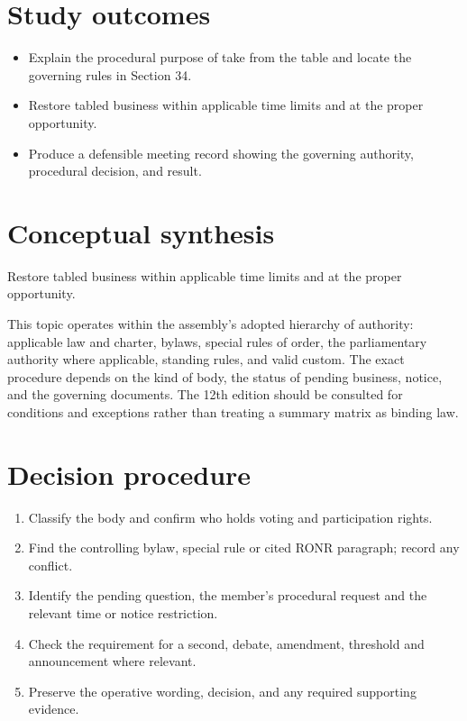 \documentclass[11pt]{article}
\begin{document}
\SuiteOpen
{}
\section{Study outcomes}
\begin{itemize}[leftmargin=*,itemsep=4pt]
\item Explain the procedural purpose of take from the table and locate the governing rules in Section 34.
\item Restore tabled business within applicable time limits and at the proper opportunity.
\item Produce a defensible meeting record showing the governing authority, procedural decision, and result.
\end{itemize}

\section{Conceptual synthesis}
Restore tabled business within applicable time limits and at the proper opportunity.

This topic operates within the assembly’s adopted hierarchy of authority: applicable law and charter, bylaws, special rules of order, the parliamentary authority where applicable, standing rules, and valid custom. The exact procedure depends on the kind of body, the status of pending business, notice, and the governing documents. The 12th edition should be consulted for conditions and exceptions rather than treating a summary matrix as binding law.
\section{Decision procedure}
\begin{enumerate}[leftmargin=*,itemsep=4pt]
\item Classify the body and confirm who holds voting and participation rights.
\item Find the controlling bylaw, special rule or cited RONR paragraph; record any conflict.
\item Identify the pending question, the member’s procedural request and the relevant time or notice restriction.
\item Check the requirement for a second, debate, amendment, threshold and announcement where relevant.
\item Preserve the operative wording, decision, and any required supporting evidence.
\end{enumerate}
\end{document}
